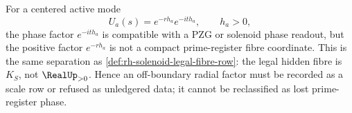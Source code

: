 \begin{principle}
\label{prin:rh-solenoid-fibres-not-radial-scale-ledgers}
For a centered active mode
$$
U_a(s)=e^{-rh_a}e^{-ith_a},
\qquad
h_a>0,
$$
the phase factor $e^{-ith_a}$ is compatible with a PZG or solenoid phase
readout, but the positive factor $e^{-rh_a}$ is not a compact
prime-register fibre coordinate. This is the same separation as
\autoref{def:rh-solenoid-legal-fibre-row}: the legal hidden fibre is
$K_S$, not $\RealUp_{>0}$. Hence an off-boundary radial factor must be
recorded as a scale row or refused as unledgered data; it cannot be
reclassified as lost prime-register phase.
\end{principle}
